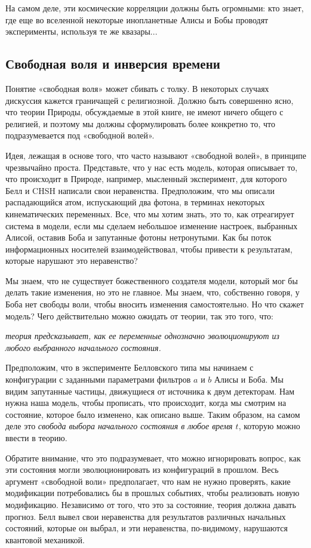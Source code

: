 \documentclass[main.tex]{subfiles}
\begin{document}
На самом деле, эти космические корреляции должны быть огромными: кто знает, где еще во вселенной некоторые инопланетные Алисы и Бобы проводят эксперименты, используя те же квазары...

\subsection{Свободная воля и инверсия времени}\label{ch3.8}

Понятие «свободная воля» может сбивать с толку. В некоторых случаях дискуссия кажется граничащей с религиозной. Должно быть совершенно ясно, что теории Природы, обсуждаемые в этой книге, не имеют ничего общего с религией, и поэтому мы должны сформулировать более конкретно то, что подразумевается под «свободной волей».

Идея, лежащая в основе того, что часто называют «свободной волей», в принципе чрезвычайно проста. Представьте, что у нас есть модель, которая описывает то, что происходит в Природе, например, мысленный эксперимент, для которого Белл и CHSH написали свои неравенства. Предположим, что мы описали распадающийся атом, испускающий два фотона, в терминах некоторых кинематических переменных. Все, что мы хотим знать, это то, как отреагирует система в модели, если мы сделаем небольшое изменение настроек, выбранных Алисой, оставив Боба и запутанные фотоны нетронутыми. Как бы поток информационных носителей взаимодействовал, чтобы привести к результатам, которые нарушают это неравенство?

Мы знаем, что не существует божественного создателя модели, который мог бы делать такие изменения, но это не главное. Мы знаем, что, собственно говоря, у Боба нет свободы воли, чтобы вносить изменения самостоятельно. Но что скажет модель? Чего действительно можно ожидать от теории, так это того, что:

\textit{теория предсказывает, как ее переменные однозначно эволюционируют из любого выбранного начального состояния.}

Предположим, что в эксперименте Белловского типа мы начинаем с конфигурации с заданными параметрами фильтров $a$ и $b$ Алисы и Боба. Мы видим запутанные частицы, движущиеся от источника к двум детекторам. Нам нужна наша модель, чтобы прописать, что происходит, когда мы смотрим на состояние, которое было изменено, как описано выше. Таким образом, на самом деле это \textit{свобода выбора начального состояния в любое время $t$}, которую можно ввести в теорию.

Обратите внимание, что это подразумевает, что можно игнорировать вопрос, как эти состояния могли эволюционировать из конфигураций в прошлом. Весь аргумент «свободной воли» предполагает, что нам не нужно проверять, какие модификации потребовались бы в прошлых событиях, чтобы реализовать новую модификацию. Независимо от того, что это за состояние, теория должна давать прогноз. Белл вывел свои неравенства для результатов различных начальных состояний, которые он выбрал, и эти неравенства, по-видимому, нарушаются квантовой механикой.
\end{document}
